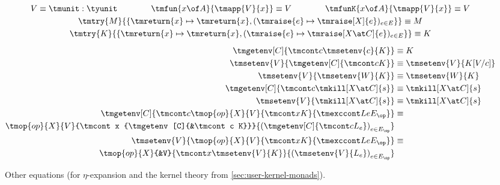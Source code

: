\begin{figure}[tb]
  \centering
  \parbox{\textwidth}{
  \small
  \begin{gather*}
    V \equiv \tmunit : \tyunit \qquad\qquad
    \tmfun{x \of A}{\tmapp{V}{x}} \equiv V \qquad\qquad
    \tmfunK{x \of A}{\tmapp{V}{x}} \equiv V
    \\
    \tmtry{M}{
       \{ \tmreturn{x} \mapsto \tmreturn{x},
          (\tmraise{e} \mapsto \tmraise[X]{e})_{e \in E}
       \}
    }
    \equiv M
    \\
    \tmtry{K}{
       \{ \tmreturn{x} \mapsto \tmreturn{x},
          (\tmraise{e} \mapsto \tmraise[X \at C]{e})_{e \in E}
       \}
    }
    \equiv K
    \\[1ex]
  \begin{aligned}
  \tmgetenv[C]{\tmcont c {\tmsetenv{c}{K}}} &\equiv K
  \\
  \tmsetenv{V}{\tmgetenv[C]{\tmcont c K}} &\equiv
  \tmsetenv{V}{K[V/c]}
  \\
  \tmsetenv{V}{\tmsetenv{W}{K}} &\equiv \tmsetenv{W}{K}
  \\
  \tmgetenv[C]{\tmcont c {\tmkill[X \at C]{s}}} &\equiv
  \tmkill[X \at C]{s}
  \\
  \tmsetenv{V}{\tmkill[X \at C]{s}} &\equiv
  \tmkill[X \at C]{s}
  \\
  \tmgetenv[C]{\tmcont c {\tmop{op}{X}{V}{\tmcont x K}{\tmexccont L e {E_\op}}}}
  &\equiv \\
  \tmop{op}{X}{V}{\tmcont x {\tmgetenv[C]{&\tmcont c K}}}{\left(\tmgetenv[C]{\tmcont c {L_e}}\right)_{e \in E_\op}}
  \\
  \tmsetenv{V}{\tmop{op}{X}{V}{\tmcont x K}{\tmexccont L e {E_\op}}}
  &\equiv \\
  \tmop{op}{X}{&V}{\tmcont x {\tmsetenv{V}{K}}}{\left(\tmsetenv{V}{L_e}\right)_{e \in E_\op}}
  \end{aligned}
  \end{gather*}
  } %
  \caption{Other equations (for $\eta$-expansion and the kernel theory from \cref{sec:user-kernel-monads}).}
  \label{fig:other-equations}
\end{figure}

